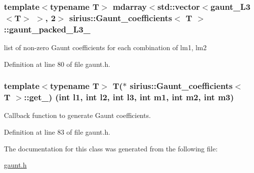 \subsubsection[{gaunt\+\_\+packed\+\_\+\+L3\+\_\+}]{\setlength{\rightskip}{0pt plus 5cm}template$<$typename T$>$ {\bf mdarray}$<$std\+::vector$<${\bf gaunt\+\_\+\+L3}$<$T$>$ $>$, 2$>$ {\bf sirius\+::\+Gaunt\+\_\+coefficients}$<$ T $>$\+::gaunt\+\_\+packed\+\_\+\+L3\+\_\+\hspace{0.3cm}{\ttfamily [private]}}\label{classsirius_1_1_gaunt__coefficients_ae81678a8f6226e3f1d92037ad5f2e1ad}


list of non-\/zero Gaunt coefficients for each combination of lm1, lm2 



Definition at line 80 of file gaunt.\+h.

\hypertarget{classsirius_1_1_gaunt__coefficients_a961b21cb591368c29d088526bae2f535}{}
\subsubsection[{get\+\_\+}]{\setlength{\rightskip}{0pt plus 5cm}template$<$typename T$>$ T($\ast$ {\bf sirius\+::\+Gaunt\+\_\+coefficients}$<$ T $>$\+::get\+\_\+) (int l1, int l2, int l3, int m1, int m2, int m3)\hspace{0.3cm}{\ttfamily [private]}}\label{classsirius_1_1_gaunt__coefficients_a961b21cb591368c29d088526bae2f535}


Callback function to generate Gaunt coefficients. 



Definition at line 83 of file gaunt.\+h.



The documentation for this class was generated from the following file\+:\begin{DoxyCompactItemize}
\item 
\hyperlink{gaunt_8h}{gaunt.\+h}\end{DoxyCompactItemize}
